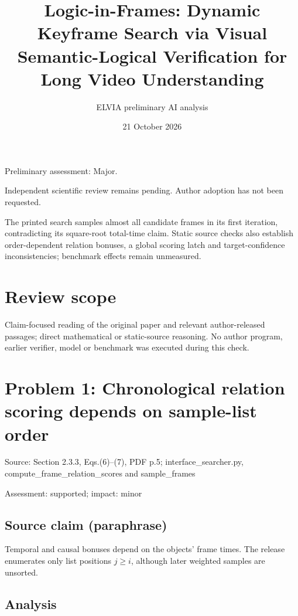 \documentclass[11pt]{article}
\begin{document}
\title{Logic-in-Frames: Dynamic Keyframe Search via Visual Semantic-Logical Verification for Long Video Understanding}

\author{ELVIA preliminary AI analysis}\date{21 October 2026}\maketitle

Preliminary assessment: Major.\par

Independent scientific review remains pending. Author adoption has not been requested.

The printed search samples almost all candidate frames in its first iteration, contradicting its square-root total-time claim. Static source checks also establish order-dependent relation bonuses, a global scoring latch and target-confidence inconsistencies; benchmark effects remain unmeasured.

\section*{Review scope}

Claim-focused reading of the original paper and relevant author-released passages; direct mathematical or static-source reasoning. No author program, earlier verifier, model or benchmark was executed during this check.

\section*{Problem 1: Chronological relation scoring depends on sample-list order}

Source: Section 2.3.3, Eqs.(6)–(7), PDF p.5; interface\_searcher.py, compute\_frame\_relation\_scores and sample\_frames

Assessment: supported; impact: minor

\subsection*{Source claim (paraphrase)}

Temporal and causal bonuses depend on the objects’ frame times. The release enumerates only list positions \(j\geq i\), although later weighted samples are unsorted.

\subsection*{Analysis}
\end{document}
